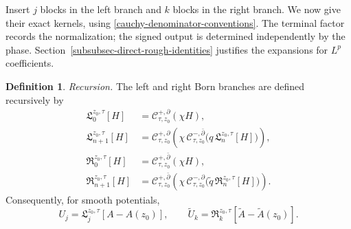 \documentclass[a4paper,11pt]{article}
\theoremstyle{plain}
\theoremstyle{definition}
\newtheorem{dfn}[thm]{Definition}
\theoremstyle{remark}
\begin{document}
Insert $j$ blocks in the left branch and $k$ blocks in the right branch. We now give their exact kernels, using \eqref{cauchy-denominator-conventions}. The terminal factor records the normalization; the signed output is determined independently by the phase. Section~\ref{subsubsec-direct-rough-identities} justifies the expansions for $L^p$ coefficients.

\begin{dfn}\label{dfn-exact-born-branches}
\textit{Recursion.}
The left and right Born branches are defined recursively by
\begin{align}
        \mathfrak L_0^{z_0,\tau}[H]
        &=\mathcal C_{\tau,z_0}^{+,\partial}(\chi H),
        \label{exact-left-branch-0}\\
        \mathfrak L_{n+1}^{z_0,\tau}[H]
        &=\mathcal C_{\tau,z_0}^{+,\partial}
          \left(\chi\,
          \mathcal C_{\tau,z_0}^{-,\bar\partial}
          \bigl(q\,\mathfrak L_n^{z_0,\tau}[H]\bigr)\right),
        \label{exact-left-branch-rec}\\
        \mathfrak R_0^{z_0,\tau}[H]
        &=\mathcal C_{\tau,z_0}^{+,\bar\partial}(\chi H),
        \label{exact-right-branch-0}\\
        \mathfrak R_{n+1}^{z_0,\tau}[H]
        &=\mathcal C_{\tau,z_0}^{+,\bar\partial}
          \left(\chi\,
          \mathcal C_{\tau,z_0}^{-,\partial}
          \bigl(\widetilde q\,\mathfrak R_n^{z_0,\tau}[H]\bigr)\right).
        \label{exact-right-branch-rec}
\end{align}
Consequently, for smooth potentials,
\begin{equation}\label{branch-identities-Uj}
        U_j=\mathfrak L_j^{z_0,\tau}[A-A(z_0)],
        \qquad
        \widetilde U_k=
        \mathfrak R_k^{z_0,\tau}[\widetilde A-\widetilde A(z_0)] .
\end{equation}


\end{dfn}
\end{document}
